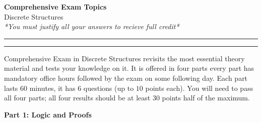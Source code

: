 \documentclass[a4paper,12pt]{article}
\begin{document}
\begin{center}
{\bf\Huge Comprehensive Exam Topics} \\[5pt]
Discrete Structures \\
\textit{*You must justify all your answers to recieve full credit*}
\end{center}

\hrule
\vspace{2pt}
\hrule
\vspace{12pt}

Comprehensive Exam in Discrete Structures revisits the most essential theory material and tests your knowledge on it.
It is offered in four parts \textendash{} every part has mandatory office hours
followed by the exam on some following day.  
Each part lasts $60$ minutes, it has $6$ questions (up to $10$ points each).
You will need to pass all four parts;
all four results should be at least $30$ points  \textendash{} half of the maximum.


\vspace{10pt}
{\bf Part 1: Logic and Proofs}
\end{document}
